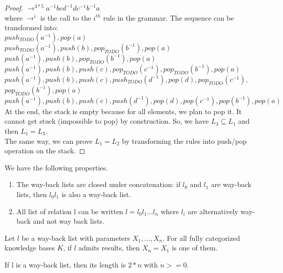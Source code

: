 \documentclass[10pt,a4paper,draft]{article}
\begin{document}
\begin{proof}
$\rightarrow^{3*5} a^{-1} b c d^{-1} d c^{-1} b^{-1} a$ \\
where $\rightarrow^i$ is the call to the $i^{th}$ rule in the grammar. The sequence can be transformed into: \\
$push_{TODO}(a^{-1}), pop(a)$ \\
$push_{TODO}(a^{-1}), push(b), pop_{TODO}(b^{-1}), pop(a)$ \\
$push(a^{-1}), push(b), pop_{TODO}(b^{-1}), pop(a)$ \\
$push(a^{-1}), push(b), push(c), pop_{TODO}(c^{-1}), pop_{TODO}(b^{-1}), pop(a)$ \\
$push(a^{-1}), push(b), push(c), push_{TODO}(d^{-1}), pop(d), pop_{TODO}(c^{-1}),$ \\
$pop_{TODO}(b^{-1}), pop(a)$ \\
$push(a^{-1}), push(b), push(c), push(d^{-1}), pop(d), pop(c^{-1}), pop(b^{-1}), pop(a)$ \\
At the end, the stack is empty because for all elements, we plan to pop it. It cannot get stuck (impossible to pop) by construction. So, we have $L_3 \subseteq L_1$ and then $L_1 = L_3$.\\
The same way, we can prove $L_1 = L_2$ by transforming the rules into push/pop operation on the stack.
\end{proof}

\begin{Property}
We have the following properties.
\begin{enumerate}
\item The way-back lists are closed under concatenation: if $l_0$ and $l_1$ are way-back lists, then $l_0 l_1$ is also a way-back list.
\item \label{decompositionWBL} All list of relation l can be written $l = l_0 l_1 ... l_n$ where $l_i$ are alternatively way-back and not way back lists.
\end{enumerate}
\end{Property}

\begin{Theorem}
\label{comebacktheorem}
Let $l$ be a way-back list with parameters $X_1,...,X_n$. For all fully categorized knowledge bases $K$, if $l$ admits results, then $X_n = X_1$ is one of them.
\end{Theorem}

\begin{Lemma}
If l is a way-back list, then its length is $2*n$ with $n >= 0$.
\end{Lemma}
\end{document}

